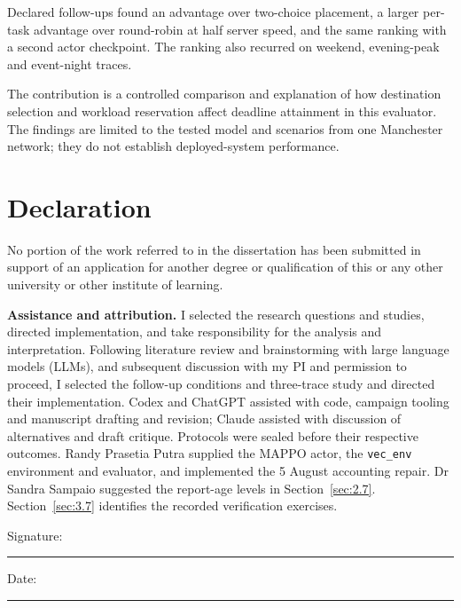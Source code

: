 \documentclass[12pt,a4paper]{article}
\begin{document}
Declared follow-ups found an advantage over two-choice placement, a larger per-task advantage over round-robin at half server speed, and the same ranking with a second actor checkpoint. The ranking also recurred on weekend, evening-peak and event-night traces.

The contribution is a controlled comparison and explanation of how destination selection and workload reservation affect deadline attainment in this evaluator. The findings are limited to the tested model and scenarios from one Manchester network; they do not establish deployed-system performance.


\clearpage
\section*{Declaration}
No portion of the work referred to in the dissertation has been submitted in support of an application for another degree or qualification of this or any other university or other institute of learning.

\textbf{Assistance and attribution.} I selected the research questions and studies, directed implementation, and take responsibility for the analysis and interpretation. Following literature review and brainstorming with large language models (LLMs), and subsequent discussion with my PI and permission to proceed, I selected the follow-up conditions and three-trace study and directed their implementation. Codex and ChatGPT assisted with code, campaign tooling and manuscript drafting and revision; Claude assisted with discussion of alternatives and draft critique. Protocols were sealed before their respective outcomes. Randy Prasetia Putra supplied the MAPPO actor, the \texttt{vec\_env} environment and evaluator, and implemented the 5 August accounting repair. Dr Sandra Sampaio suggested the report-age levels in Section~\ref{sec:2.7}. Section~\ref{sec:3.7} identifies the recorded verification exercises.

\bigskip
Signature: \rule{60mm}{0.3pt}\qquad Date: \rule{25mm}{0.3pt}
\clearpage
\end{document}
